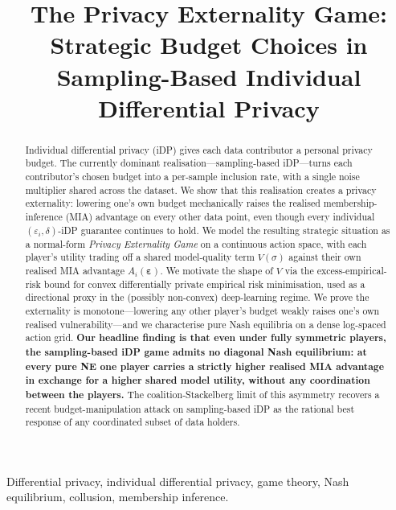 \documentclass[conference]{IEEEtran}
\title{The Privacy Externality Game:\\
Strategic Budget Choices in Sampling-Based Individual Differential Privacy}
\author{
\IEEEauthorblockN{Anonymous Submission}
}
\theoremstyle{plain}
\theoremstyle{definition}
\theoremstyle{remark}
\newcommand{\eps}{\varepsilon}
\begin{document}
\maketitle

\begin{abstract}
Individual differential privacy (iDP) gives each data contributor a personal
privacy budget. The currently dominant realisation---sampling-based iDP---turns
each contributor's chosen budget into a per-sample inclusion rate, with a single
noise multiplier shared across the dataset. We show that this realisation
creates a privacy externality: lowering one's own budget mechanically raises
the realised membership-inference (MIA) advantage on every other data point,
even though every individual $(\eps_i, \delta)$-iDP guarantee continues to
hold. We model the resulting strategic situation as a normal-form
\emph{Privacy Externality Game} on a continuous action space, with each
player's utility trading off a shared model-quality term $V(\sigma)$ against
their own realised MIA advantage $A_i(\boldsymbol{\eps})$. We motivate the
shape of $V$ via the excess-empirical-risk bound for convex differentially
private empirical risk minimisation, used as a directional proxy in the
(possibly non-convex) deep-learning regime. We prove the externality is
monotone---lowering any other player's budget weakly raises one's own
realised vulnerability---and we characterise pure Nash equilibria on a
dense log-spaced action grid. \textbf{Our headline finding is that even
under fully symmetric players, the sampling-based iDP game admits no
diagonal Nash equilibrium: at every pure NE one player carries a strictly
higher realised MIA advantage in exchange for a higher shared model
utility, without any coordination between the players.} The
coalition-Stackelberg limit of this asymmetry recovers a recent
budget-manipulation attack on sampling-based iDP as the rational best
response of any coordinated subset of data holders.
\end{abstract}

\begin{IEEEkeywords}
Differential privacy, individual differential privacy, game theory, Nash
equilibrium, collusion, membership inference.
\end{IEEEkeywords}














\end{document}

